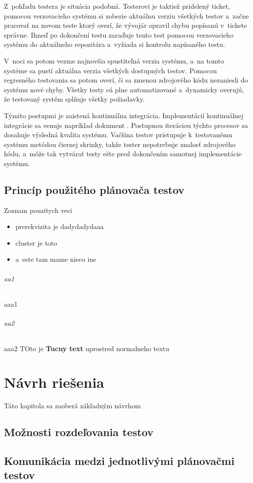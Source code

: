 Z~pohľadu testera je situácia podobná. Testerovi je taktiež pridelený ticket, pomocou verzovacieho systému si zoberie aktuálnu verziu
všetkých testov a~začne pracovať na novom teste ktorý overí, že vývojár opravil chybu popísanú v~tickete správne.
Ihneď po dokončení testu zaraďuje tento test pomocou verzovacieho systému do aktuálneho repozitára a~vyžiada si
kontrolu napísaného testu. 

V~noci sa potom vezme najnovšia spustiteľná verzia systému, a~na tomto systéme sa pustí aktuálna verzia
všetkých dostupných testov. Pomocou regresného testovania sa potom overí, či sa zmenou zdrojového kódu nezaniesli do systému nové
chyby. Všetky testy sú plne automatizované a~dynamicky overujú, že testovaný systém splňuje všetky požiadavky.

Týmito postupmi je zaistená kontinuálna integrácia. Implementácií kontinuálnej integrácie 
sa venuje napríklad dokument \cite{Continuous_integration_implementation}. 
Postupnou iteráciou týchto procesov sa dosahuje výsledná kvalita systému. Vačšina testov pristupuje k~testovanému
systému metódou čiernej skrinky, takže tester nepotrebuje znalosť zdrojového kódu, a~môže tak vytvárať testy
ešte pred dokončením samotnej implementácie systému. 



\section{Princíp použitého plánovača testov} \label{sekcia:planovac}
Zoznam pouzitych veci
\begin{itemize}
\item prerekvizita je dadydadydaaa
\item cluster je toto
\item a~este tam mame nieco ine
\end{itemize}

\subparagraph{aa1}
aaa1
\subparagraph{aa2}
aaa2
TOto je \textbf{Tucny text} uprostred  normalneho textu

\chapter{Návrh riešenia}
Táto kapitola sa zaoberá základným návrhom
\section{Možnosti rozdeľovania testov}
\section{Komunikácia medzi jednotlivými plánovačmi testov}
